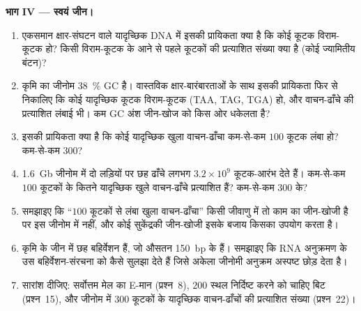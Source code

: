 \begin{problem}
\medskip
\noindent\textbf{भाग IV --- स्वयं जीन।}
\begin{enumerate}[resume]
  \item एकसमान क्षार-संघटन वाले यादृच्छिक DNA में इसकी प्रायिकता क्या
        है कि कोई कूटक विराम-कूटक हो? किसी विराम-कूटक के आने से पहले
        कूटकों की प्रत्याशित संख्या क्या है (कोई ज्यामितीय बंटन)?
  \item कृमि का जीनोम \qty{38}{\%} GC है। वास्तविक क्षार-बारंबारताओं
        के साथ इसकी प्रायिकता फिर से निकालिए कि कोई यादृच्छिक कूटक
        विराम-कूटक (TAA, TAG, TGA) हो, और वाचन-ढाँचे की प्रत्याशित
        लंबाई भी। कम GC अंश जीन-खोज को किस ओर धकेलता है?
  \item इसकी प्रायिकता क्या है कि कोई यादृच्छिक खुला वाचन-ढाँचा
        कम-से-कम $100$ कूटक लंबा हो? कम-से-कम $300$?
  \item \qty{1.6}{Gb} जीनोम में दो लड़ियों पर छह ढाँचे लगभग
        $3.2\times 10^{9}$ कूटक-आरंभ देते हैं। कम-से-कम $100$ कूटकों
        के कितने यादृच्छिक खुले वाचन-ढाँचे प्रत्याशित हैं? कम-से-कम
        $300$ के?
  \item समझाइए कि ``$100$ कूटकों से लंबा खुला वाचन-ढाँचा'' किसी जीवाणु
        में तो काम का जीन-खोजी है पर इस जीनोम में नहीं, और कोई
        सुकेंद्रकी जीन-खोजी इसके बजाय किसका उपयोग करता है।
  \item कृमि के जीन में छह बहिर्वेशन हैं, जो औसतन \qty{150}{bp} के
        हैं। समझाइए कि RNA अनुक्रमण के  उस बहिर्वेशन-संरचना को
        कैसे सुलझा देते हैं जिसे अकेला जीनोमी अनुक्रम अस्पष्ट छोड़ देता है।
  \item सारांश दीजिए: सर्वोत्तम मेल का E-मान (प्रश्न~8), $200$ स्थल
        निर्दिष्ट करने को चाहिए बिट (प्रश्न~15), और जीनोम में $300$
        कूटकों के यादृच्छिक वाचन-ढाँचों की प्रत्याशित संख्या
        (प्रश्न~22)।
\end{enumerate}
\end{problem}
